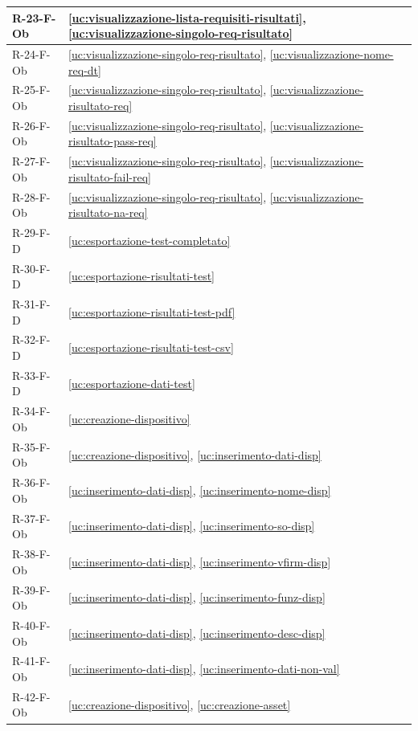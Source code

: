 ﻿\documentclass[a4paper,12pt]{article}
\begin{document}
{\begin{longtable}{|
      >{\centering\arraybackslash}p{}|
      >{\centering\arraybackslash}p{}|
      }
        R-23-F-Ob & \ref{uc:visualizzazione-lista-requisiti-risultati}, \ref{uc:visualizzazione-singolo-req-risultato} \\ \hline
        R-24-F-Ob & \ref{uc:visualizzazione-singolo-req-risultato}, \ref{uc:visualizzazione-nome-req-dt} \\ \hline
        R-25-F-Ob & \ref{uc:visualizzazione-singolo-req-risultato}, \ref{uc:visualizzazione-risultato-req} \\ \hline
        R-26-F-Ob & \ref{uc:visualizzazione-singolo-req-risultato}, \ref{uc:visualizzazione-risultato-pass-req} \\ \hline
        R-27-F-Ob & \ref{uc:visualizzazione-singolo-req-risultato}, \ref{uc:visualizzazione-risultato-fail-req} \\ \hline
        R-28-F-Ob & \ref{uc:visualizzazione-singolo-req-risultato}, \ref{uc:visualizzazione-risultato-na-req} \\ \hline
        R-29-F-D & \ref{uc:esportazione-test-completato} \\ \hline
        R-30-F-D & \ref{uc:esportazione-risultati-test} \\ \hline
        R-31-F-D & \ref{uc:esportazione-risultati-test-pdf} \\ \hline
        R-32-F-D & \ref{uc:esportazione-risultati-test-csv} \\ \hline
        R-33-F-D & \ref{uc:esportazione-dati-test} \\ \hline
        R-34-F-Ob & \ref{uc:creazione-dispositivo} \\ \hline
        R-35-F-Ob & \ref{uc:creazione-dispositivo}, \ref{uc:inserimento-dati-disp} \\ \hline
        R-36-F-Ob & \ref{uc:inserimento-dati-disp}, \ref{uc:inserimento-nome-disp} \\ \hline
        R-37-F-Ob & \ref{uc:inserimento-dati-disp}, \ref{uc:inserimento-so-disp} \\ \hline
        R-38-F-Ob & \ref{uc:inserimento-dati-disp}, \ref{uc:inserimento-vfirm-disp} \\ \hline
        R-39-F-Ob & \ref{uc:inserimento-dati-disp}, \ref{uc:inserimento-funz-disp} \\ \hline
        R-40-F-Ob & \ref{uc:inserimento-dati-disp}, \ref{uc:inserimento-desc-disp} \\ \hline
        R-41-F-Ob & \ref{uc:inserimento-dati-disp}, \ref{uc:inserimento-dati-non-val} \\ \hline
        R-42-F-Ob & \ref{uc:creazione-dispositivo}, \ref{uc:creazione-asset} \\ \hline

\end{longtable}}
\end{document}
